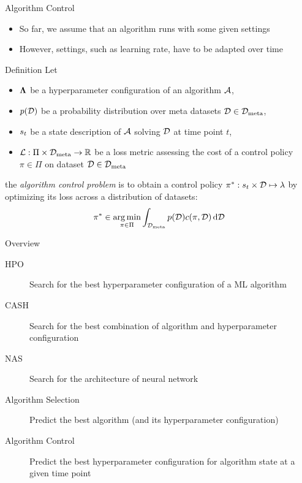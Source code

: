 \begin{frame}[c]{Algorithm Control}

\begin{itemize}
	\item So far, we assume that an algorithm runs with some given settings
	\item However, settings, such as learning rate, have to be adapted over time
\end{itemize}

\begin{block}{Definition}
	Let 
	\begin{itemize}
		\item $\mathbf{\Lambda}$ be a hyperparameter configuration of an algorithm $\mathcal{A}$,
		\pause
		\item $p(\mathcal{D})$ be a probability distribution over meta datasets $\mathcal{D} \in \mathcal{D}_{\text{meta}}$,
		\pause
		\item $s_t$ be a state description of $\mathcal{A}$ solving $\mathcal{D}$ at time point $t$,
		\pause
		\item $\mathcal{L}: \Pi \times \mathcal{D}_{\text{meta}} \to \mathbb{R}$ be a loss metric assessing the cost of a control policy $\pi \in \Pi$ on dataset $\mathcal{D} \in \mathcal{D}_{\text{meta}}$
	\end{itemize}
	
	\pause
	the \emph{algorithm control problem} is to obtain a control policy $\pi^* : s_t \times \mathcal{D} \mapsto \mathbf{\lambda}$ by optimizing its loss across a distribution of datasets:
	\begin{equation}
	\pi^* \in \operatorname*{arg\,min}_{\pi \in \Pi} \int_{\mathcal{D}_{\text{meta}}} p(\mathcal{D}) c(\pi, \mathcal{D}) \mathop{}\!\mathrm{d} \mathcal{D} \nonumber
	\end{equation}
\end{block}

\end{frame}
\begin{frame}[c]{Overview}

\begin{description}
	\item[HPO] Search for the best hyperparameter configuration of a ML algorithm
	\item[CASH] Search for the best combination of algorithm and hyperparameter configuration
	\item[NAS] Search for the architecture of neural network
	\item[Algorithm Selection] Predict the best algorithm (and its hyperparameter configuration)
	\item[Algorithm Control] Predict the best hyperparameter configuration for algorithm state at a given time point 
\end{description}

\end{frame}

